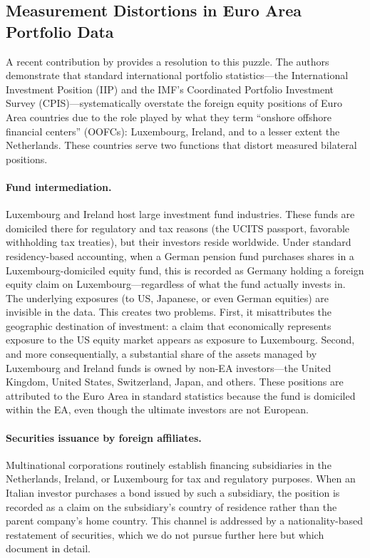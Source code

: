 \documentclass{article}
\begin{document}
\subsection{Measurement Distortions in Euro Area Portfolio Data}

A recent contribution by \cite{beck2024} provides a resolution to this puzzle. 
The authors demonstrate that standard international portfolio statistics---the 
International Investment Position (IIP) and the IMF's Coordinated Portfolio 
Investment Survey (CPIS)---systematically overstate the foreign equity 
positions of Euro Area countries due to the role played by what they term 
``onshore offshore financial centers'' (OOFCs): Luxembourg, Ireland, and 
to a lesser extent the Netherlands. These countries serve two functions 
that distort measured bilateral positions.

\paragraph{Fund intermediation.} Luxembourg and Ireland host large 
investment fund industries. These funds are domiciled there for regulatory 
and tax reasons (the UCITS passport, favorable withholding tax treaties), 
but their investors reside worldwide. Under standard residency-based 
accounting, when a German pension fund purchases shares in a 
Luxembourg-domiciled equity fund, this is recorded as Germany holding a 
foreign equity claim on Luxembourg---regardless of what the fund actually 
invests in. The underlying exposures (to US, Japanese, or even German 
equities) are invisible in the data. This creates two problems. First, it 
misattributes the geographic destination of investment: a claim that 
economically represents exposure to the US equity market appears as 
exposure to Luxembourg. Second, and more consequentially, a substantial 
share of the assets managed by Luxembourg and Ireland funds is owned by 
non-EA investors---the United Kingdom, United States, Switzerland, Japan, 
and others. These positions are attributed to the Euro Area in standard 
statistics because the fund is domiciled within the EA, even though the 
ultimate investors are not European.

\paragraph{Securities issuance by foreign affiliates.} Multinational 
corporations routinely establish financing subsidiaries in the Netherlands, 
Ireland, or Luxembourg for tax and regulatory purposes. When an Italian 
investor purchases a bond issued by such a subsidiary, the position is 
recorded as a claim on the subsidiary's country of residence rather than 
the parent company's home country. This channel is addressed by a 
nationality-based restatement of securities, which we do not pursue further 
here but which \cite{beck2024} document in detail.
\end{document}
